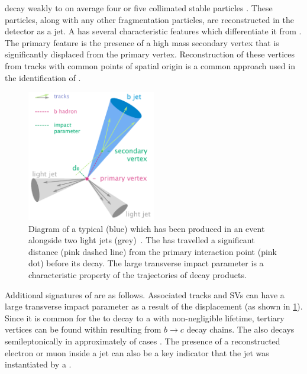 \bhadrons decay weakly to on average four or five collimated stable particles \cite{ATL-PHYS-PUB-2014-008}.
These particles, along with any other fragmentation particles, are reconstructed in the detector as a jet.
A \bjet has several characteristic features which differentiate it from \ljets.
The primary feature is the presence of a high mass secondary vertex that is significantly displaced from the primary vertex.
Reconstruction of these vertices from tracks with common points of spatial origin is a common approach used in the identification of \bjets.


\begin{figure}[!tbp]
  \centering
  \includegraphics[width=0.5\textwidth]{chapters/3.tracking/figs/b-jet-diagram.png}
  \caption{
    Diagram of a typical \bjet (blue) which has been produced in an event alongside two light jets (grey)~\cite{bjetdiagram}.
    The \bhadron has travelled a significant distance (pink dashed line) from the primary interaction point (pink dot) before its decay.
    The large transverse impact parameter \dzero is a characteristic property of the trajectories of \bhadron decay products.}
  \label{fig:bjet_diagram}
\end{figure}


Additional signatures of \bhadrons are as follows.
Associated tracks and SVs can have a large transverse impact parameter \dzero as a result of the \bhadron displacement (as shown in \cref{fig:bjet_diagram}).
Since it is common for the \bhadron to decay to a \chadron with non-negligible lifetime, tertiary vertices can be found within \bjets resulting from $b \rightarrow c$ decay chains.
The \borchadron also decays semileptonically in approximately  of cases \cite{Workman:2022ynf}.
The presence of a reconstructed electron or muon inside a jet can also be a key indicator that the jet was instantiated by a \bhadron.

